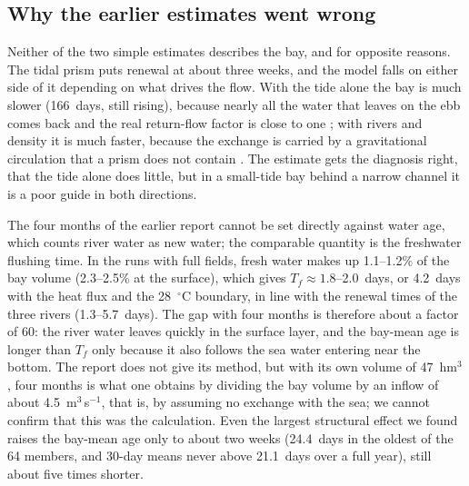 \documentclass[a4paper,fleqn]{ems-dc}
\begin{document}
\subsection{Why the earlier estimates went wrong}\label{sec:jica}
Neither of the two simple estimates describes the bay, and for opposite reasons. The tidal
prism puts renewal at about three weeks, and the model falls on either side of it depending
on what drives the flow. With the tide alone the bay is much slower (166~days, still
rising), because nearly all the water that leaves on the ebb comes back and the real
return-flow factor is close to one \citep{Sanford1992}; with rivers and density it is much
faster, because the exchange is carried by a gravitational circulation that a prism does
not contain \citep{MacCready2010}. The estimate gets the diagnosis right, that the tide alone
does little, but in a small-tide bay behind a narrow channel it is a poor guide in both
directions.

The four months of the earlier report \citep{JICA2004} cannot be set directly against water
age, which counts river water as new water; the comparable quantity is the freshwater
flushing time. In the runs with full fields, fresh water makes up 1.1--1.2\% of the bay
volume (2.3--2.5\% at the surface), which gives $T_f \approx 1.8$--2.0~days, or 4.2~days
with the heat flux and the 28~$^\circ$C boundary, in line with the renewal times of the three
rivers (1.3--5.7~days). The gap with four months is therefore about a factor of 60: the river water leaves quickly
in the surface layer, and the bay-mean age is longer than $T_f$ only because it also follows
the sea water entering near the bottom. The report does not give its method, but with its
own volume of 47~hm$^3$, four months is what one obtains by dividing the bay volume by an
inflow of about 4.5~m$^3$\,s$^{-1}$, that is, by assuming no exchange with the sea; we cannot
confirm that this was the calculation. Even the largest structural effect we found raises the
bay-mean age only to about two weeks (24.4~days in the oldest of the 64 members, and 30-day
means never above 21.1~days over a full year), still about five times shorter.
\end{document}
